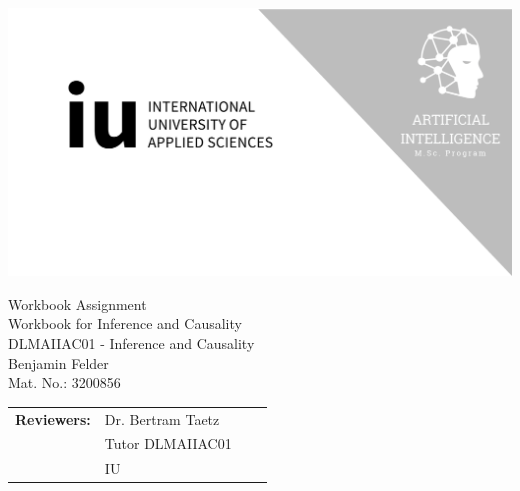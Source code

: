 

\def\Mytitle{Workbook for Inference and Causality}
\def\Mysubtitle{Workbook Assignment}
\def\Mycourse{DLMAIIAC01 - Inference and Causality}
\def\Myauthor{Benjamin Felder}
\def\MyMatricNum{3200856}


\def\RNameA{Dr. Bertram Taetz}
\def\RFunctionA{Tutor DLMAIIAC01}
\def\RInstitutionA{IU}

\def\RNameB{}
\def\RFunctionB{}
\def\RInstitutionB{}

\def\RNameC{}
\def\RFunctionC{}
\def\RInstitutionC{}

\thispagestyle{empty}

\centerline{\includegraphics[width=\paperwidth]{template/img/cover-image.png}}

\vspace{8.5em}

{\Large \Mysubtitle}\\
{\Huge \Mytitle}\\
{\LARGE \Mycourse}\\
{\LARGE \Myauthor}\\
{\Large Mat. No.: \MyMatricNum}\\

\vspace*{\fill}

\begin{tabular}{p{0.8in} p{1.5in} p{1.5in} p{1.5in}}
    \textbf{Reviewers:} & \RNameA        & \RNameB        & \RNameC        \\
                        & \RFunctionA    & \RFunctionB    & \RFunctionC    \\
                        & \RInstitutionA & \RInstitutionB & \RInstitutionC
\end{tabular}


\restoregeometry
\clearpage
